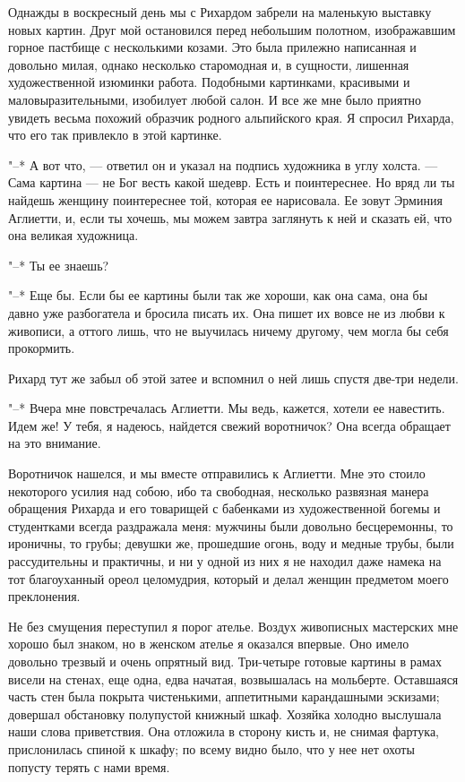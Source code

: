 Однажды  в  воскресный  день  мы   с  Рихардом  забрели  на  маленькую
выставку новых картин. Друг  мой остановился перед небольшим полотном,
изображавшим   горное  пастбище   с  несколькими   козами.  Это   была
прилежно  написанная и  довольно милая,  однако несколько  старомодная
и,  в сущности,  лишенная  художественной  изюминки работа.  Подобными
картинками, красивыми  и маловыразительными, изобилует любой  салон. И
все  же  мне было  приятно  увидеть  весьма похожий  образчик  родного
альпийского  края. Я  спросил Рихарда,  что его  так привлекло  в этой
картинке.

"--* А вот  что, --- ответил он  и указал на подпись  художника в углу
холста.  --- Сама  картина  ---  не Бог  весть  какой  шедевр. Есть  и
поинтереснее. Но вряд ли ты  найдешь женщину поинтереснее той, которая
ее нарисовала. Ее зовут Эрминия Аглиетти,  и, если ты хочешь, мы можем
завтра заглянуть к ней и сказать ей, что она великая художница.

"--* Ты ее знаешь?

"--* Еще бы. Если бы ее картины  были так же хороши, как она сама, она
бы давно уже разбогатела и бросила писать их. Она пишет их вовсе не из
любви к живописи, а оттого лишь,  что не выучилась ничему другому, чем
могла бы себя прокормить.

Рихард тут же забыл об этой затее и вспомнил о ней лишь спустя две-три
недели.

"--* Вчера  мне повстречалась  Аглиетти. Мы  ведь, кажется,  хотели ее
навестить. Идем же! У тебя, я надеюсь, найдется свежий воротничок? Она
всегда обращает на это внимание.

Воротничок нашелся, и мы вместе отправились к Аглиетти. Мне это стоило
некоторого  усилия над  собою, ибо  та свободная,  несколько развязная
манера обращения Рихарда и его товарищей с бабенками из художественной
богемы  и студентками  всегда раздражала  меня: мужчины  были довольно
бесцеремонны, то ироничны, то грубы; девушки же, прошедшие огонь, воду
и медные трубы, были рассудительны и практичны,  и ни у одной из них я
не находил даже намека на тот благоуханный ореол целомудрия, который и
делал женщин предметом моего преклонения.

Не  без   смущения  переступил  я  порог   ателье.  Воздух  живописных
мастерских  мне хорошо  был знаком,  но  в женском  ателье я  оказался
впервые. Оно имело  довольно трезвый и очень  опрятный вид. Три-четыре
готовые  картины в  рамах висели  на стенах,  еще одна,  едва начатая,
возвышалась  на   мольберте.  Оставшаяся   часть  стен   была  покрыта
чистенькими,  аппетитными карандашными  эскизами; довершал  обстановку
полупустой  книжный   шкаф.  Хозяйка  холодно  выслушала   наши  слова
приветствия.  Она  отложила в  сторону  кисть  и, не  снимая  фартука,
прислонилась спиной к шкафу; по всему  видно было, что у нее нет охоты
попусту терять с нами время.

